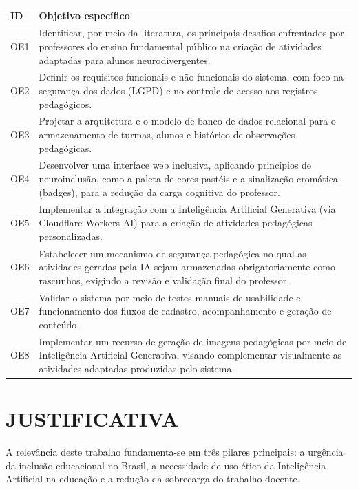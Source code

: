 \begin{quadro}[H]
\centering
\caption{Objetivos específicos do trabalho}
\label{qua:objetivos-especificos}
\begin{tabular}{|l|p{15cm}|}
\hline
\textbf{ID} & \textbf{Objetivo específico} \\
\hline
OE1 & Identificar, por meio da literatura, os principais desafios enfrentados por professores do ensino fundamental público na criação de atividades adaptadas para alunos neurodivergentes. \\
\hline
OE2 & Definir os requisitos funcionais e não funcionais do sistema, com foco na segurança dos dados (LGPD) e no controle de acesso aos registros pedagógicos. \\
\hline
OE3 & Projetar a arquitetura e o modelo de banco de dados relacional para o armazenamento de turmas, alunos e histórico de observações pedagógicas. \\
\hline
OE4 & Desenvolver uma interface web inclusiva, aplicando princípios de neuroinclusão, como a paleta de cores pastéis e a sinalização cromática (badges), para a redução da carga cognitiva do professor. \\
\hline
OE5 & Implementar a integração com a Inteligência Artificial Generativa (via Cloudflare Workers AI) para a criação de atividades pedagógicas personalizadas. \\
\hline
OE6 & Estabelecer um mecanismo de segurança pedagógica no qual as atividades geradas pela IA sejam armazenadas obrigatoriamente como rascunhos, exigindo a revisão e validação final do professor. \\
\hline
OE7 & Validar o sistema por meio de testes manuais de usabilidade e funcionamento dos fluxos de cadastro, acompanhamento e geração de conteúdo. \\
\hline
OE8 & Implementar um recurso de geração de imagens pedagógicas por meio de Inteligência Artificial Generativa, visando complementar visualmente as atividades adaptadas produzidas pelo sistema. \\
\hline
\end{tabular}
\end{quadro}

\section{JUSTIFICATIVA}

A relevância deste trabalho fundamenta-se em três pilares principais: a urgência da inclusão educacional no Brasil, a necessidade de uso ético da Inteligência Artificial na educação e a redução da sobrecarga do trabalho docente.


